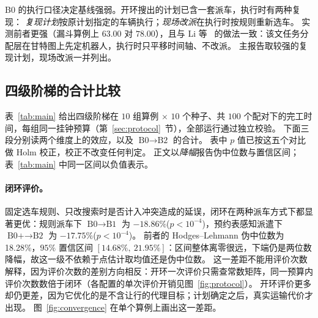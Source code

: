 \documentclass[manuscript,screen,review]{acmart}
\newcommand{\NCases}{10}
\newcommand{\NSeeds}{10}
\newcommand{\NPairs}{100}
\newcommand{\GainLoopRule}{18.86\%}      %
\newcommand{\PLoopRule}{<10^{-4}}
\newcommand{\GainLoopProbe}{17.75\%}     %
\newcommand{\PLoopProbe}{<10^{-4}}
\newcommand{\HLLoopRule}{18.28\%}
\newcommand{\CILoopRule}{$[14.68\%,\ 21.95\%]$}
\begin{document}
B0 的执行口径决定基线强弱。开环搜出的计划已含一套派车，执行时有两种复现：
\emph{复现计划}按原计划指定的车辆执行；\emph{现场改派}在执行时按规则重新选车。
实测前者更强（漏斗算例上 $63.00$ 对 $78.00$），且与 Li 等~\cite{li2026framework} 的做法一致：该文任务分配层在甘特图上先定机器人，执行时只平移时间轴、不改派。
主报告取较强的复现计划，现场改派一并列出。

\subsection{四级阶梯的合计比较}
\label{sec:main}

表~\ref{tab:main} 给出四级阶梯在 $\NCases$ 组算例 $\times$ $\NSeeds$ 个种子、共
$\NPairs$ 个配对下的完工时间，每组同一挂钟预算（第~\ref{sec:protocol}~节），全部运行通过独立校验。
下面三段分别读两个维度上的效应，以及 $\text{B0}\to\text{B2}$ 的合计。
表中 $p$ 值已按这五个对比做 Holm 校正，校正不改变任何判定。
正文以\emph{降幅}报告伪中位数与置信区间；表~\ref{tab:main} 中同一区间以负值表示。

\begin{table}[t]
\caption{四级阶梯在同挂钟预算下的完工时间，以及两个维度上只改一处的四个配对。
负值表示完工时间下降，即更好。$n=\NPairs$ 个按 $(\text{算例},\text{种子})$ 配对的比较，
双侧 Wilcoxon 符号秩检验；$p$ 值已按本表五个对比做 Holm 校正
($^{*}p<0.05$、$^{**}p<0.01$、$^{***}p<0.001$)。HL 列为逐对相对增益的 Hodges--Lehmann
伪中位数及其 $95\%$ 分布无关置信区间（见第~\ref{sec:protocol}~节）。
表头加粗者为本文配置；数值不加粗，因 B2 并非每组最优（逐组结果见表~\ref{tab:bytag}）。}
\label{tab:main}
\small

\end{table}

\paragraph{闭环评价。}
固定选车规则、只改搜索时是否计入冲突造成的延误，闭环在两种派车方式下都显著更优：规则派车下
$\text{B0}\to\text{B1}$ 为 $-\GainLoopRule$($p\PLoopRule$)，预约表感知派遣下
$\text{B0+}\to\text{B2}$ 为 $-\GainLoopProbe$($p\PLoopProbe$)。
前者的 Hodges--Lehmann 伪中位数为 \HLLoopRule{}，$95\%$ 置信区间 \CILoopRule{}：区间整体离零很远，下端仍是两位数降幅，故这一级不依赖于点估计取均值还是伪中位数。
这一差距不能用评价次数解释，因为评价次数的差别方向相反：开环一次评价只需查常数矩阵，同一预算内评价次数数倍于闭环（各配置的单次评价开销见图~\ref{fig:protocol}）。
开环评价更多却仍更差，因为它优化的是不含让行的代理目标；计划确定之后，真实运输代价才出现。
图~\ref{fig:convergence} 在单个算例上画出这一差距。
\end{document}
